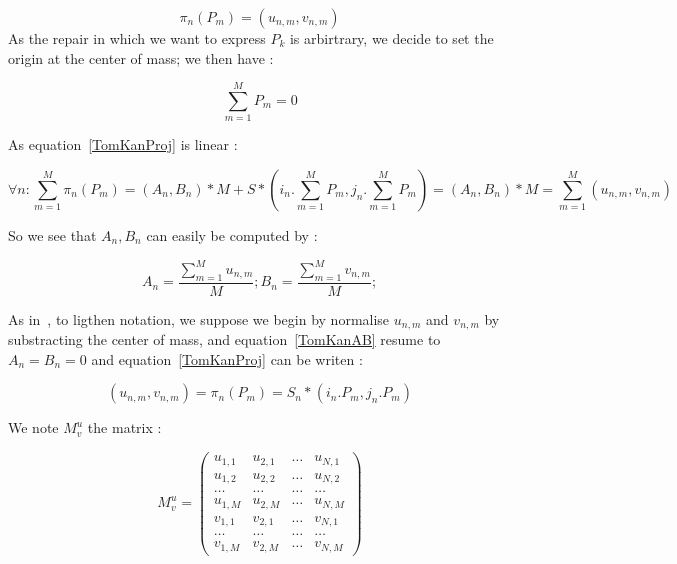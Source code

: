 \begin{equation}
    \pi_n(P_m) = (u_{n,m},v_{n,m})
\end{equation}
As the repair in which we want to express $P_k$ is arbirtrary, we decide to  set the 
origin at the center of mass; we then have   :


\begin{equation}
   \sum_{m=1}^{M} P_m = 0 \label{TomKanCDM}
\end{equation}

As equation~\ref{TomKanProj} is linear : 


\begin{equation}
     \forall n : \sum_{m=1}^{M} \pi_n(P_m)  
     =  (A_n,B_n) * M + S *(i_n. \sum_{m=1}^{M} P_m,j_n. \sum_{m=1}^{M} P_m)
     = (A_n,B_n) * M
     = \sum_{m=1}^{M} (u_{n,m},v_{n,m})
\end{equation}

So we see that $A_n,B_n$ can easily be computed by  :


\begin{equation}
   A_n = \frac{\sum_{m=1}^{M}u_{n,m}}{M} ;
   B_n = \frac{\sum_{m=1}^{M}v_{n,m}}{M} ; \label{TomKanAB}
\end{equation}

As in~\cite{TomKan}, to ligthen notation, we suppose we begin by normalise $u_{n,m}$ and $v_{n,m}$ 
by substracting the center of mass, and equation~\ref{TomKanAB} resume to $A_n=B_n=0$ and
equation~\ref{TomKanProj} can be writen :


\begin{equation}
   (u_{n,m},v_{n,m}) =  \pi_n(P_m) =   S_n * (i_n . P_m, j_n.P_m) \label{TomKanProj2}
\end{equation}


We note $M^u_v$ the matrix :


\begin{equation}
M^u_v=
\left( \begin{array}{cccc} 
             u_{1,1} & u_{2,1}  & \dots & u_{N,1} \\ 
             u_{1,2} & u_{2,2}  & \dots & u_{N,2} \\
              \dots &  \dots  & \dots &   \dots   \\
             u_{1,M} & u_{2,M}  & \dots & u_{N,M} \\
             v_{1,1} & v_{2,1}  & \dots & v_{N,1} \\ 
              \dots &  \dots  & \dots &   \dots   \\
             v_{1,M} & v_{2,M}  & \dots & v_{N,M} 
        \end{array} 
\right)
\label{TomKanMuv}
\end{equation}


